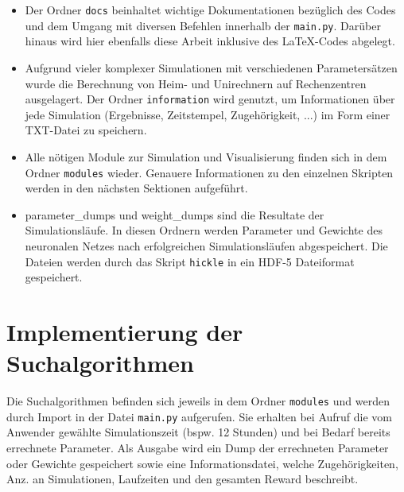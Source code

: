 	\begin{minipage}{0.65\textwidth}
		\begin{itemize}
			\item Der Ordner \texttt{docs} beinhaltet wichtige Dokumentationen bezüglich des Codes und dem Umgang mit diversen Befehlen innerhalb der \texttt{main.py}. Darüber hinaus wird hier ebenfalls diese Arbeit inklusive des \LaTeX-Codes abgelegt.
			\item Aufgrund vieler komplexer Simulationen mit verschiedenen Parametersätzen wurde die Berechnung von Heim- und Unirechnern auf Rechenzentren ausgelagert. Der Ordner \texttt{information} wird genutzt, um Informationen über jede Simulation (Ergebnisse, Zeitstempel, Zugehörigkeit, ...) im Form einer TXT-Datei zu speichern.
			\item Alle nötigen Module zur Simulation und Visualisierung finden sich in dem Ordner \texttt{modules} wieder. Genauere Informationen zu den einzelnen Skripten werden in den nächsten Sektionen aufgeführt.
			\item parameter\_dumps und weight\_dumps sind die Resultate der Simulationsläufe. In diesen Ordnern werden Parameter und Gewichte des neuronalen Netzes nach erfolgreichen Simulationsläufen abgespeichert. Die Dateien werden durch das Skript \texttt{hickle} in ein HDF-5 Dateiformat \cite{hdf5} gespeichert.
		\end{itemize}		
	\end{minipage}
	
	
		
\section{Implementierung der Suchalgorithmen}
\label{sec:imp_search}
	Die Suchalgorithmen befinden sich jeweils in dem Ordner \texttt{modules} und werden durch Import in der Datei \texttt{main.py} aufgerufen. Sie erhalten bei Aufruf die vom Anwender gewählte Simulationszeit (bspw. 12 Stunden) und bei Bedarf bereits errechnete Parameter. Als Ausgabe wird ein Dump der errechneten Parameter oder Gewichte gespeichert sowie eine Informationsdatei, welche Zugehörigkeiten, Anz. an Simulationen, Laufzeiten und den gesamten Reward beschreibt. 
	
